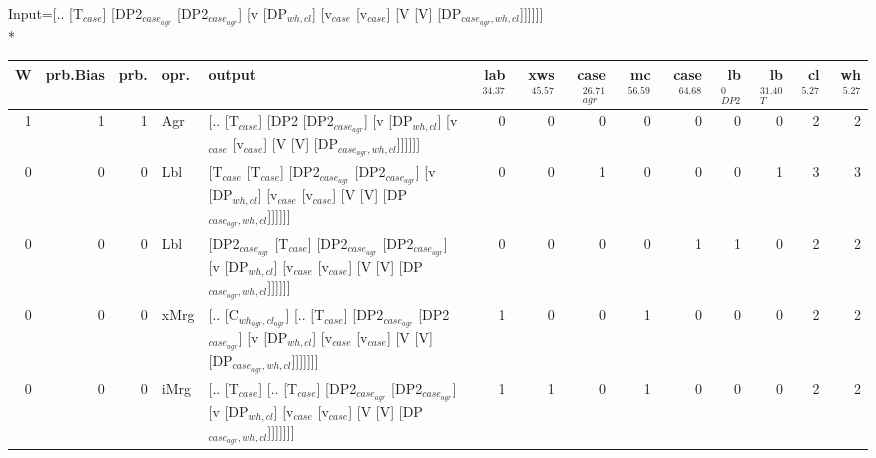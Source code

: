 \begingroup\scriptsize Input=[.. [T$_{case}$] [DP2$_{case_{agr}}$ [DP2$_{case_{agr}}$] [v [DP$_{wh,cl}$] [v$_{case}$ [v$_{case}$] [V [V] [DP$_{case_{agr},wh,cl}$]]]]]]\\*
\begin{tabularx}{\linewidth}{rrrlXrrrrrrrrr}
\hline
   W &   prb.Bias &   prb. & opr.   & output                                                                                                                                                                                                   &   lab$^{34.37}$ &   xws$^{45.57}$ &   case$_{agr}^{26.71}$ &   mc$^{56.59}$ &   case$^{64.68}$ &   lb$_{DP2}^{0}$ &   lb$_{T}^{31.40}$ &   cl$^{5.27}$ &   wh$^{5.27}$ \\
\hline
   1 &       1 &   1 & Agr  & [.. [T$_{case}$] [DP2 [DP2$_{case_{agr}}$] [v [DP$_{wh,cl}$] [v$_{case}$ [v$_{case}$] [V [V] [DP$_{case_{agr},wh,cl}$]]]]]]                                                                                                          &             0 &             0 &                  0 &            0 &              0 &            0 &              0 &        2 &        2 \\
   0 &       0 &   0 & Lbl  & [T$_{case}$ [T$_{case}$] [DP2$_{case_{agr}}$ [DP2$_{case_{agr}}$] [v [DP$_{wh,cl}$] [v$_{case}$ [v$_{case}$] [V [V] [DP$_{case_{agr},wh,cl}$]]]]]]                                                                                             &             0 &             0 &                  1 &            0 &              0 &            0 &              1 &        3 &        3 \\
   0 &       0 &   0 & Lbl  & [DP2$_{case_{agr}}$ [T$_{case}$] [DP2$_{case_{agr}}$ [DP2$_{case_{agr}}$] [v [DP$_{wh,cl}$] [v$_{case}$ [v$_{case}$] [V [V] [DP$_{case_{agr},wh,cl}$]]]]]]                                                                                       &             0 &             0 &                  0 &            0 &              1 &            1 &              0 &        2 &        2 \\
   0 &       0 &   0 & xMrg & [.. [C$_{wh_{agr},cl_{agr}}$] [.. [T$_{case}$] [DP2$_{case_{agr}}$ [DP2$_{case_{agr}}$] [v [DP$_{wh,cl}$] [v$_{case}$ [v$_{case}$] [V [V] [DP$_{case_{agr},wh,cl}$]]]]]]]                                                                          &             1 &             0 &                  0 &            1 &              0 &            0 &              0 &        2 &        2 \\
   0 &       0 &   0 & iMrg & [.. [T$_{case}$] [.. [T$_{case}$] [DP2$_{case_{agr}}$ [DP2$_{case_{agr}}$] [v [DP$_{wh,cl}$] [v$_{case}$ [v$_{case}$] [V [V] [DP$_{case_{agr},wh,cl}$]]]]]]]                                                                                   &             1 &             1 &                  0 &            1 &              0 &            0 &              0 &        2 &        2 \\

\end{tabularx}
